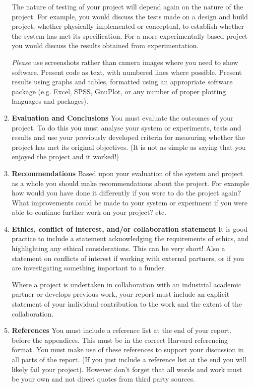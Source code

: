 \begin{enumerate}
    The nature of testing of your project will depend again on the nature of the project. For example, you would discuss the tests made on a design and build project, whether physically implemented or conceptual, to establish whether the system has met its specification. For a more experimentally based project you would discuss the results obtained from experimentation.

    \textit{Please} use screenshots rather than camera images where you need to show software. Present code as text, with numbered lines where possible. Present results using graphs and tables, formatted using an appropriate software package (e.g. Excel, SPSS, GnuPlot, or any number of proper plotting languages and packages).

    \item \textbf{Evaluation and Conclusions}
    \subitem You must evaluate the outcomes of your project. To do this you must analyse your system or experiments, tests and results and use your previously developed criteria for measuring whether the project has met its original objectives. (It is not as simple as saying that you enjoyed the project and it worked!)
    
    \item \textbf{Recommendations}
    \subitem Based upon your evaluation of the system and project as a whole you should make recommendations about the project. For example how would you have done it differently if you were to do the project again? What improvements could be made to your system or experiment if you were able to continue further work on your project? etc.

    \item \textbf{Ethics, conflict of interest, and/or collaboration statement}
    \subitem It is good practice to include a statement acknowledging the requirements of ethics, and highlighting any ethical considerations. This can be very short! Also a statement on conflicts of interest if working with external partners, or if you are investigating something important to a funder.

    \begin{tcolorbox}
        Where a project is undertaken in collaboration with an industrial academic partner or develops previous work, your report must include an explicit statement of your individual contribution to the work and the extent of the collaboration.
    \end{tcolorbox}
    
    \item \textbf{References}
    \subitem You must include a reference list at the end of your report, before the appendices. This must be in the correct Harvard referencing format. You must make use of these references to support your discussion in all parts of the report. (If you just include a reference list at the end you will likely fail your project). However don’t forget that all words and work must be your own and not direct quotes from third party sources.


\end{enumerate}
